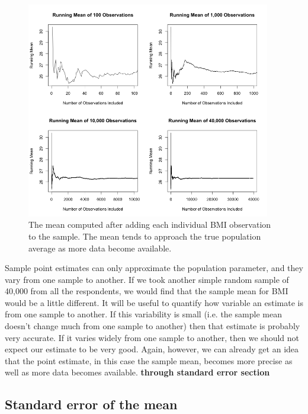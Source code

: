 \begin{figure}
   \centering
   \includegraphics[width=0.95\textwidth]{ch_inference_foundations_oi_biostat/figures/netTimeRunningMean/netBMIRunningMean}
   \caption{The mean computed after adding each individual BMI observation to the sample. The mean tends to approach the true population average as more data become available.}
   \label{netBMIRunningMean}
\end{figure}

Sample point estimates can only approximate the population parameter, and they vary from one sample to another. If we took another simple random sample of 40,000 from all the  respondents, we would find that the sample mean for BMI would be a little different. It will be useful to quantify how variable
an estimate is from one sample to another. If this variability is small (i.e. the sample mean doesn't change much from one sample to another) then that estimate is probably very accurate. If it varies widely from one sample to another, then we should not expect our estimate to be very good. Again, however, we can already get an idea that the point estimate, in this case the sample mean, becomes more precise as well as more data becomes available. \textbf{through standard error section}


\subsection{Standard error of the mean}
\label{seOfTheMean}

